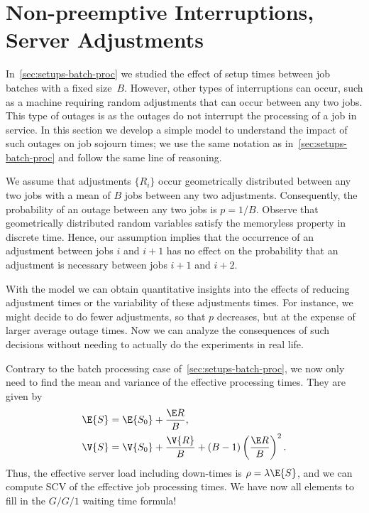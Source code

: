 \section{Non-preemptive Interruptions, Server Adjustments}
\label{sec:non-preempt-interr}





In~\cref{sec:setups-batch-proc} we studied the effect of setup times between job batches with a fixed size~$B$.
However, other types of interruptions can occur, such as a machine requiring random adjustments that can occur between any two jobs.
This type of outages is  as the outages do not interrupt the processing of a job in service.
In this section we develop a simple model to understand the impact of such outages on job sojourn times; we use the same notation as in~\cref{sec:setups-batch-proc} and follow the same line of reasoning.

We assume that adjustments $\{R_i\}$ occur geometrically distributed between any two jobs with a mean of $B$ jobs between any two adjustments.
Consequently, the probability of an outage between any two jobs is $p=1/B$.
Observe that geometrically distributed random variables satisfy the memoryless property in discrete time.
Hence, our assumption implies that the occurrence of an adjustment between jobs $i$ and $i+1$ has no effect on the probability that an adjustment is necessary between jobs $i+1$ and $i+2$.

With the model we can obtain quantitative insights into the effects of reducing adjustment times or the variability of these adjustments times.
For instance, we might decide to do fewer adjustments, so that $p$ decreases, but at the expense of larger average outage times.
Now we can analyze the consequences of such decisions without needing to actually do the experiments in real life. 

Contrary to the batch processing case of~\cref{sec:setups-batch-proc}, we now only need to find the mean and variance of the effective processing times. They are given by
\begin{align}
 \E{S} &= \E{S_0} + \frac{\E R}B, \label{eq:88}\\
 \V{S} &= \V{S_0} + \frac{\V{R}} B + (B-1)\left(\frac{\E R}{B}\right)^2.\label{eq:89} 
\end{align}
Thus, the effective server load including down-times is $\rho = \lambda \E{S}$, and we can compute SCV of the effective job processing times.
We have now all elements to fill in the $G/G/1$ waiting time formula!




